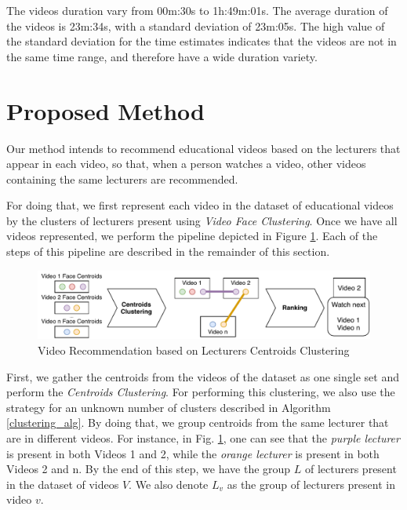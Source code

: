 The videos duration vary from 00m:30s to 1h:49m:01s. 
The average duration of the videos is 23m:34s, with a standard deviation of 23m:05s. 
The high value of the standard deviation for the time estimates indicates that the videos are not in the same time range, and therefore have a wide duration variety. 

\section{Proposed Method}
\label{sec:recommendation_method}

Our method intends to recommend educational videos based on the lecturers that appear in each video, so that, when a person watches a video, other videos containing the same lecturers are recommended.

For doing that, we first represent each video in the dataset of educational videos by the clusters of lecturers present using \emph{Video Face Clustering}. Once we have all videos represented, we perform the pipeline depicted in Figure \ref{fig:video_recommendation}. Each of the steps of this pipeline are described in the remainder of this section.

\begin{figure}[!ht]
  \centering
  \includegraphics[width=1\textwidth]{img/video_recommendation/video_recommendation.pdf}
  \caption{Video Recommendation based on Lecturers Centroids Clustering}
  \label{fig:video_recommendation}
\end{figure}

First, we gather the centroids from the videos of the dataset as one single set and perform the \textit{Centroids Clustering}.
For performing this clustering, we also use the strategy for an unknown number of clusters described in Algorithm \ref{clustering_alg}.
By doing that, we group centroids from the same lecturer that are in different videos. For instance, in Fig. \ref{fig:video_recommendation}, one can see that the \emph{purple lecturer} is present in both Videos 1 and 2, while the \emph{orange lecturer} is present in both Videos 2 and n. By the end of this step, we have the group $L$ of lecturers present in the dataset of videos $V$. We also denote $L_v$ as the group of lecturers present in video $v$.


